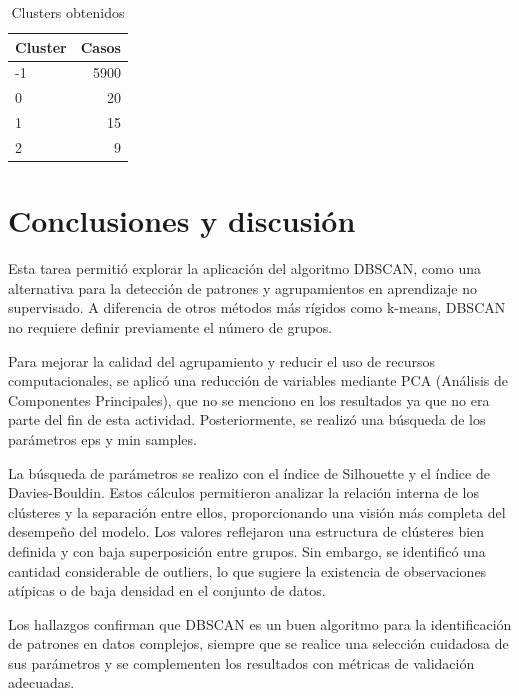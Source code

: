 \documentclass{article}
\begin{document}
\begin{table}
\caption{Clusters obtenidos}
\centering
\begin{tabular}{|l|r|} \hline 
Cluster & Casos \\ \hline \hline
-1      & 5900  \\ \hline
0       & 20   \\ \hline
1       & 15  \\ \hline
2       & 9    \\ \hline
\end{tabular}
\label{tab:clusters}
\end{table}

\section{Conclusiones y discusión}

Esta tarea permitió explorar la aplicación del algoritmo DBSCAN, como una alternativa para la detección de patrones y agrupamientos en aprendizaje no supervisado. A diferencia de otros métodos más rígidos como k-means, DBSCAN no requiere definir previamente el número de grupos.

Para mejorar la calidad del agrupamiento y reducir el uso de recursos computacionales, se aplicó una reducción de variables mediante PCA (Análisis de Componentes Principales), que no se menciono en los resultados ya que no era parte del fin de esta actividad. Posteriormente, se realizó una búsqueda de los parámetros eps y min samples.

La búsqueda de parámetros se realizo con el índice de Silhouette y el índice de Davies-Bouldin. Estos cálculos permitieron analizar la relación interna de los clústeres y la separación entre ellos, proporcionando una visión más completa del desempeño del modelo. Los valores reflejaron una estructura de clústeres bien definida y con baja superposición entre grupos. Sin embargo, se identificó una cantidad considerable de outliers, lo que sugiere la existencia de observaciones atípicas o de baja densidad en el conjunto de datos.

Los hallazgos confirman que DBSCAN es un buen algoritmo para la identificación de patrones en datos complejos, siempre que se realice una selección cuidadosa de sus parámetros y se complementen los resultados con métricas de validación adecuadas. 



\end{document}
